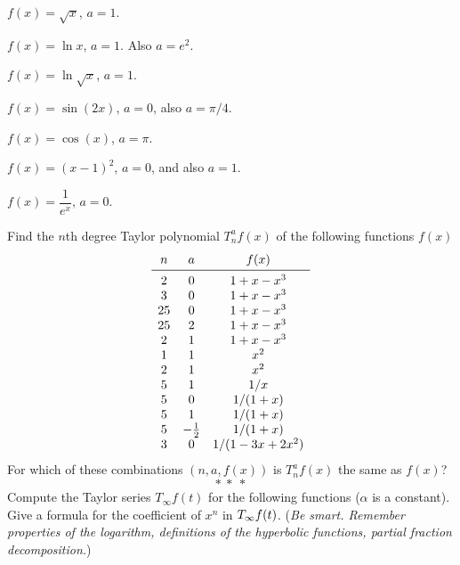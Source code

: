 \begin{multicols}{2}
\problem $f(x) = \sqrt x$, $a=1$. %

\problem $f(x) = \ln x$, $a=1$. Also $a=e^2$. %

\problem $f(x) = \ln\sqrt{x}$, $a=1$. %

\problem $f(x) = \sin(2x)$, $a=0$, also $a=\pi/4$. %

\problem $f(x) = \cos(x)$, $a=\pi$. %

\problem $f(x) = (x-1)^2$, $a=0$, and also $a=1$. %

\problem $f(x) = \dfrac1{e^x}$, $a=0$. %

\problem Find the $n$th degree Taylor polynomial $T_n^af(x)$ of the %
following functions $f(x)$
\[
\begin{array}{ccc}
  n&a& f(x) \\
  \midrule
  2&0 & 1+ x-x^3 \\
  3&0 & 1+ x-x^3 \\
  25&0 & 1+x-x^3 \\
  25&2 & 1+x-x^3 \\
  2&1 & 1+ x-x^3 \\
  1 &1 & x^2 \\
  2 &1 & x^2 \\
  5&1 & 1/x \\
  5&0 & {1}/(1+x) \\
  5&1 & {1}/(1+x) \\
  5&-\frac12 & {1}/(1+x) \\
  3&0 & {1}/(1-3x+2x^2)
\end{array}
\]
For which of these combinations $(n, a, f(x))$ is $T_n^af(x)$ the same
as $f(x)$?
\[
*~*~*
\]
\begingroup\noindent\color{darkbluegreen}%
Compute the Taylor series $T_\infty f(t)$ for the following functions
($\alpha$ is a constant). Give a formula for the coefficient of $x^n$
in $T_{\infty} f(t)$. (\textit{Be smart. Remember properties of the logarithm,
definitions of the hyperbolic functions, partial fraction
decomposition.})
\endgroup


\end{multicols}
